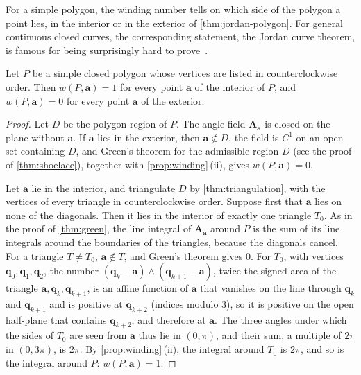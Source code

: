 For a simple polygon, the winding number tells on which side of the polygon a point lies, in the interior or in the exterior of \cref{thm:jordan-polygon}. For general continuous closed curves, the corresponding statement, the Jordan curve theorem, is famous for being surprisingly hard to prove~\cite{hales2007}.

\begin{theorem}
\label{thm:point-in-polygon}
Let $P$ be a simple closed polygon whose vertices are listed in counterclockwise order. Then $w(P,\mathbf a)=1$ for every point $\mathbf a$ of the interior of $P$, and $w(P,\mathbf a)=0$ for every point $\mathbf a$ of the exterior.
\end{theorem}

\begin{proof}
Let $D$ be the polygon region of $P$. The angle field $\mathbf A_{\mathbf a}$ is closed on the plane without $\mathbf a$. If $\mathbf a$ lies in the exterior, then $\mathbf a\notin D$, the field is $C^1$ on an open set containing $D$, and Green's theorem for the admissible region $D$ (see the proof of \cref{thm:shoelace}), together with \cref{prop:winding}\,(ii), gives $w(P,\mathbf a)=0$.

Let $\mathbf a$ lie in the interior, and triangulate $D$ by \cref{thm:triangulation}, with the vertices of every triangle in counterclockwise order. Suppose first that $\mathbf a$ lies on none of the diagonals. Then it lies in the interior of exactly one triangle $T_0$. As in the proof of \cref{thm:green}, the line integral of $\mathbf A_{\mathbf a}$ around $P$ is the sum of its line integrals around the boundaries of the triangles, because the diagonals cancel. For a triangle $T\ne T_0$, $\mathbf a\notin T$, and Green's theorem gives $0$. For $T_0$, with vertices $\mathbf q_0,\mathbf q_1,\mathbf q_2$, the number $(\mathbf q_k-\mathbf a)\wedge(\mathbf q_{k+1}-\mathbf a)$, twice the signed area of the triangle $\mathbf a,\mathbf q_k,\mathbf q_{k+1}$, is an affine function of $\mathbf a$ that vanishes on the line through $\mathbf q_k$ and $\mathbf q_{k+1}$ and is positive at $\mathbf q_{k+2}$ (indices modulo $3$), so it is positive on the open half-plane that contains $\mathbf q_{k+2}$, and therefore at $\mathbf a$. The three angles under which the sides of $T_0$ are seen from $\mathbf a$ thus lie in $(0,\pi)$, and their sum, a multiple of $2\pi$ in $(0,3\pi)$, is $2\pi$. By \cref{prop:winding}\,(ii), the integral around $T_0$ is $2\pi$, and so is the integral around $P$: $w(P,\mathbf a)=1$.


\end{proof}

